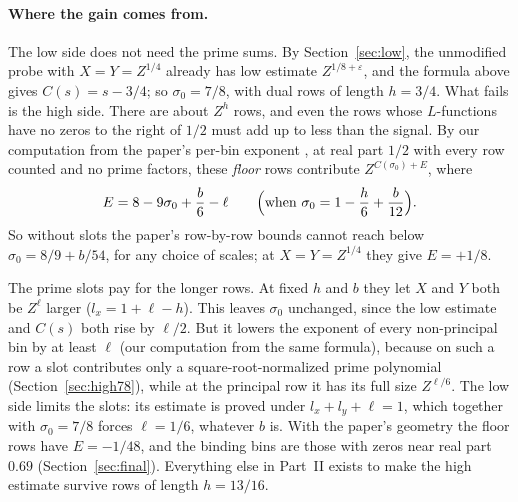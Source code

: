 \documentclass[11pt]{article}
\begin{document}
\paragraph{Where the gain comes from.} The low side does not need the prime sums. By
Section~\ref{sec:low}, the unmodified probe with $X=Y=Z^{1/4}$ already has low estimate
$Z^{1/8+\varepsilon}$, and the formula above gives $C(s)=s-3/4$; so $\sigma_0=7/8$, with dual
rows of length $h=3/4$. What fails is the high side. There are about $Z^h$ rows, and even the
rows whose $L$-functions have no zeros to the right of $1/2$ must add up to less than the
signal. By our computation from the paper's per-bin exponent
\cite[eq.\ stage-high-exponent]{OAI78}, at real part $1/2$ with every row counted and no prime
factors, these \emph{floor} rows contribute $Z^{C(\sigma_0)+E}$, where
\[
 E=8-9\sigma_0+\frac b6-\ell\qquad\Bigl(\text{when }\sigma_0=1-\frac h6+\frac b{12}\Bigr).
\]
So without slots the paper's row-by-row bounds cannot reach below $\sigma_0=8/9+b/54$, for any
choice of scales; at $X=Y=Z^{1/4}$ they give $E=+1/8$.

The prime slots pay for the longer rows. At fixed $h$ and $b$ they let $X$ and $Y$ both be
$Z^\ell$ larger ($l_x=1+\ell-h$). This leaves $\sigma_0$ unchanged, since the low estimate and
$C(s)$ both rise by $\ell/2$. But it lowers the exponent of every non-principal bin by at least
$\ell$ (our computation from the same formula), because on such a row a slot contributes only a
square-root-normalized prime polynomial (Section~\ref{sec:high78}), while at the principal row
it has its full size $Z^{\ell/6}$. The low side limits the slots: its estimate is proved under
$l_x+l_y+\ell=1$, which together with $\sigma_0=7/8$ forces $\ell=1/6$, whatever $b$ is. With
the paper's geometry the floor rows have $E=-1/48$, and the binding bins are those with zeros
near real part $0.69$ (Section~\ref{sec:final}). Everything else in Part~II exists to make the
high estimate survive rows of length $h=13/16$.
\end{document}
